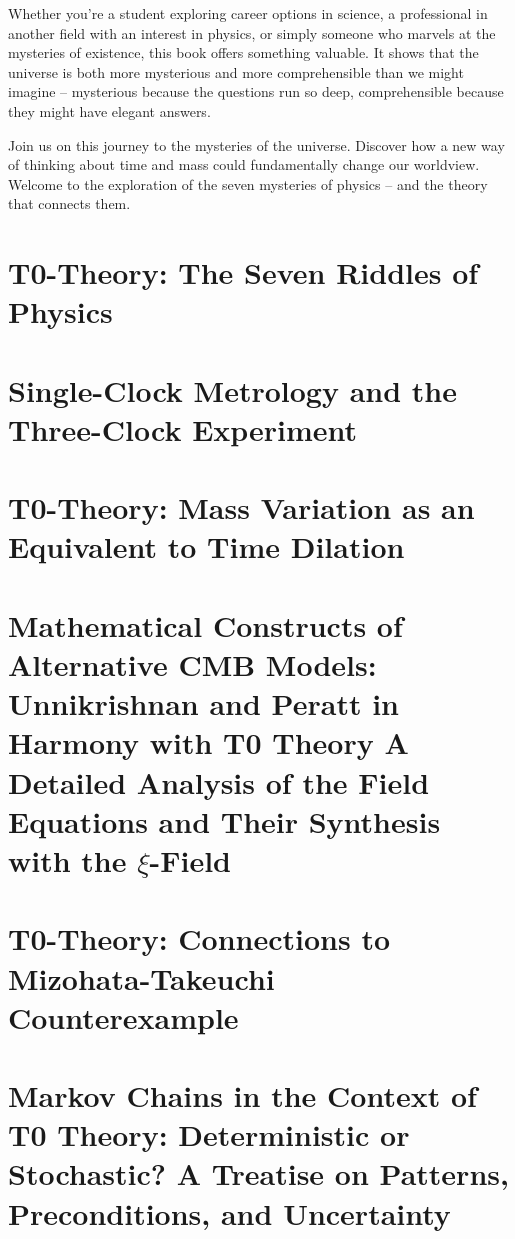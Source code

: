 \documentclass[11pt,oneside]{book}
\begin{document}
	Whether you're a student exploring career options in science, a professional in another field with an interest in physics, or simply someone who marvels at the mysteries of existence, this book offers something valuable. It shows that the universe is both more mysterious and more comprehensible than we might imagine – mysterious because the questions run so deep, comprehensible because they might have elegant answers.
	
	Join us on this journey to the mysteries of the universe. Discover how a new way of thinking about time and mass could fundamentally change our worldview. Welcome to the exploration of the seven mysteries of physics – and the theory that connects them.
	
	\chapter{T0-Theory: The Seven Riddles of Physics}
	
	
	\chapter{Single-Clock Metrology and the Three-Clock Experiment}
	
	
	\chapter{T0-Theory: Mass Variation as an Equivalent to Time Dilation}
	
	\chapter{Mathematical Constructs of Alternative CMB Models: Unnikrishnan and Peratt in Harmony with T0 Theory A Detailed Analysis of the Field Equations and Their Synthesis with the $\xi$-Field}
	
	
	\chapter{T0-Theory: Connections to Mizohata-Takeuchi Counterexample}
	
	
	\chapter{Markov Chains in the Context of T0 Theory: Deterministic or Stochastic? A Treatise on Patterns, Preconditions, and Uncertainty}
	
	
\end{document}

